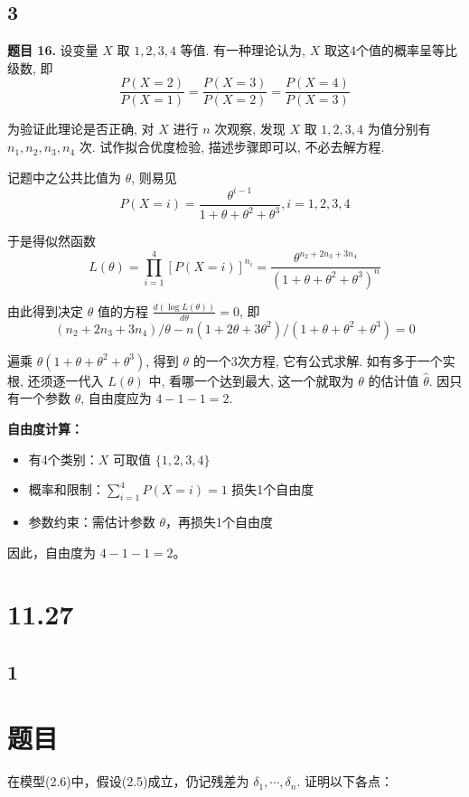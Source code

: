 \documentclass[UTF8]{report}
\theoremstyle{MyLineTheoremStyle} %
\theoremstyle{MyBlockTheoremStyle} %
\theoremstyle{MySubsubsectionStyle} %
\begin{document}
\subsection{3}

\noindent \textbf{题目 16.} 设变量 $X$ 取 $1,2,3,4$ 等值. 有一种理论认为, $X$ 取这4个值的概率呈等比级数, 即
$$\frac{P(X=2)}{P(X=1)} = \frac{P(X=3)}{P(X=2)} = \frac{P(X=4)}{P(X=3)}$$

为验证此理论是否正确, 对 $X$ 进行 $n$ 次观察, 发现 $X$ 取 $1,2,3,4$ 为值分别有 $n_1,n_2,n_3,n_4$ 次. 试作拟合优度检验, 描述步骤即可以, 不必去解方程.

记题中之公共比值为 $\theta$, 则易见
$$P(X=i) = \frac{\theta^{i-1}}{1+\theta+\theta^2+\theta^3}, i=1,2,3,4$$

于是得似然函数
$$L(\theta) = \prod_{i=1}^4[P(X=i)]^{n_i} = \frac{\theta^{n_2+2n_3+3n_4}}{(1+\theta+\theta^2+\theta^3)^n}$$

由此得到决定 $\theta$ 值的方程 $\frac{d(\log L(\theta))}{d\theta}=0$, 即
$$(n_2+2n_3+3n_4)/\theta - n(1+2\theta+3\theta^2)/(1+\theta+\theta^2+\theta^3) = 0$$

遍乘 $\theta(1+\theta+\theta^2+\theta^3)$, 得到 $\theta$ 的一个3次方程, 它有公式求解.
如有多于一个实根, 还须逐一代入 $L(\theta)$ 中, 看哪一个达到最大, 这一个就取为 $\theta$ 的估计值 $\hat{\theta}$. 因只有一个参数 $\theta$, 自由度应为 $4-1-1=2$.

\noindent \textbf{自由度计算：}
\begin{itemize}
    \item 有4个类别：$X$ 可取值 $\{1,2,3,4\}$
    \item 概率和限制：$\sum_{i=1}^4 P(X=i)=1$ 损失1个自由度
    \item 参数约束：需估计参数 $\theta$，再损失1个自由度
\end{itemize}

因此，自由度为 $4-1-1=2$。



\section{11.27}

\subsection{1}
\section*{题目}
在模型(2.6)中，假设(2.5)成立，仍记残差为 $\delta_1, \cdots, \delta_n$. 证明以下各点：
\end{document}
